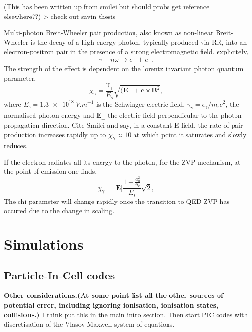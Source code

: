 (This has been written up from smilei but should probs get reference elsewhere??) > check out savin thesis

Multi-photon Breit-Wheeler pair production, also known as non-linear Breit-Wheeler is the decay of a high energy photon, typically produced via \ac{RR}, into an electron-positron pair in the presence of a strong electromagnetic field, explicitely,
\begin{equation}
	\gamma + n\omega \to e^- + e^+.
\end{equation}
The strength of the effect is dependent on the lorentz invariant photon quantum parameter,
\begin{equation}
	\chi_\gamma = \frac{\gamma_\gamma}{E_\mathrm{s}} \sqrt{(\mathbf{E}_\perp + \mathbf{c}\times \mathbf{B}^2},
\end{equation}
where $E_\mathrm{s} = \qty{1.3e18}{V.m^{-1}}$ is the Schwinger electric field, $\gamma_\gamma = \epsilon_\gamma /m_\mathrm{e}c^2$, the normalised photon energy and $\mathbf{E}_\perp$ the electric field perpendicular to the photon propagation direction. Cite Smilei and say, in a constant E-field, the rate of pair production increases rapidly up to $\chi_\gamma \approx 10$ at which point it saturates and slowly reduces.


If the electron radiates all its energy to the photon, for the ZVP mechanism, at the point of emission one finds,
\begin{equation}
	\chi_\gamma = |\mathbf{E}|\frac{1 + \frac{a^2_0}{\bar{n}_\mathrm{e}}}{E_\mathrm{s}} \sqrt{2},
\end{equation}
The chi parameter will change rapidly once the transition to QED ZVP has occured due to the change in scaling.


\section{Simulations}
\subsection{Particle-In-Cell codes}

\textbf{Other considerations:(At some point list all the other sources of potential error, including ignoring ionisation, ionisation states, collisions.)}
I think put this in the main intro section. Then start PIC codes with discretisation of the Vlasov-Maxwell system of equations.

